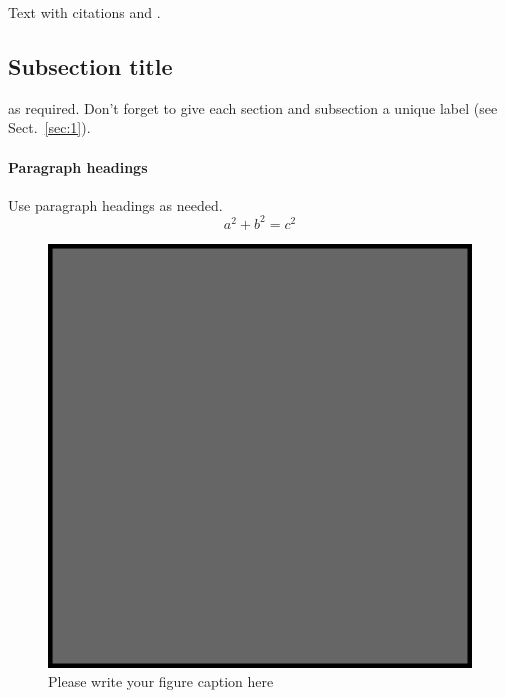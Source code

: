 \label{sec:1}
Text with citations \cite{RefB} and \cite{RefJ}.
\subsection{Subsection title}
\label{sec:2}
as required. Don't forget to give each section
and subsection a unique label (see Sect.~\ref{sec:1}).
\paragraph{Paragraph headings} Use paragraph headings as needed.
\begin{equation}
a^2+b^2=c^2
\end{equation}

\begin{figure}
  \includegraphics{example.eps}
\caption{Please write your figure caption here}
\label{fig:1}       %
\end{figure}
%
